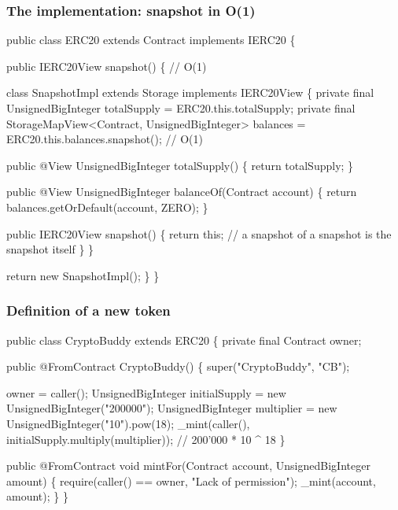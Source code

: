 \documentclass[11pt]{beamer}  %
\def\codesize{\smaller}
\def\<#1>{\codeid{#1}}
\newcommand{\codeid}[1]{\ifmmode{\mbox{\codesize\ttfamily{#1}}}\else{\codesize\ttfamily #1}\fi}
\begin{document}
\begin{frame}[fragile]\frametitle{The \<ERC20> implementation: snapshot in O(1)}

\vspace*{-2ex}
{\scriptsize\begin{semiverbatim}
public class ERC20 {\color{red}extends Contract implements IERC20} \{

  public IERC20View snapshot() \{   {\color{violet}// O(1)}

    {\color{blue}class SnapshotImpl {\color{red}extends Storage implements IERC20View} \{
      private final UnsignedBigInteger totalSupply = ERC20.this.totalSupply;
      private final StorageMapView<Contract, UnsignedBigInteger> balances
        = ERC20.this.balances.snapshot(); {\color{violet}// O(1)}

      public {\color{red}@View} UnsignedBigInteger totalSupply() \{
        return totalSupply;
      \}

      public {\color{red}@View} UnsignedBigInteger balanceOf(Contract account) \{
        return balances.getOrDefault(account, ZERO);
      \}

      public IERC20View snapshot() \{
        return this; {\color{violet}// a snapshot of a snapshot is the snapshot itself}
      \}
    \}}

    return new SnapshotImpl();
  \}
\}
\end{semiverbatim}}

\end{frame}

\begin{frame}[fragile]\frametitle{Definition of a new token}

{\scriptsize\begin{semiverbatim}
public class {\color{red}CryptoBuddy extends ERC20} \{
  private final Contract owner;

  public {\color{red}@FromContract} CryptoBuddy() \{
    super("CryptoBuddy", "CB");

    owner = caller();
    UnsignedBigInteger initialSupply = new UnsignedBigInteger("200000");
    UnsignedBigInteger multiplier = new UnsignedBigInteger("10").pow(18);
    _mint(caller(), initialSupply.multiply(multiplier)); // 200'000 * 10 ^ 18
  \}

  public @FromContract void mintFor(Contract account, UnsignedBigInteger amount) \{
    require(caller() == owner, {\color{armygreen}"Lack of permission"});
    _mint(account, amount);
  \}
\}
\end{semiverbatim}}

\end{frame}
\end{document}

